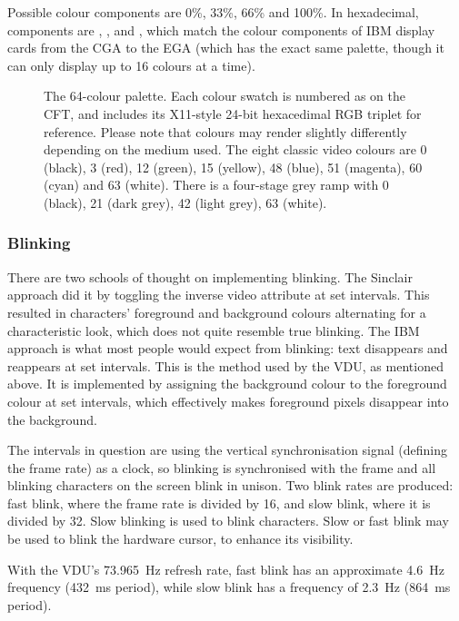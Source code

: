 Possible colour components are 0\%, 33\%, 66\% and 100\%. In hexadecimal,
components are , ,  and , which match the
colour components of IBM display cards from the CGA to the EGA (which has the
exact same palette, though it can only display up to 16 colours at a time).

\begin{figure}
 \centering
 
 \caption[The 64-colour palette]{\label{fig:vdu-colour-palette} The 64-colour
   palette. Each colour swatch is numbered as on the CFT, and includes its
   X11-style 24-bit hexacedimal RGB triplet for reference. Please note that
   colours may render slightly differently depending on the medium used. The
   eight classic video colours are 0 (black), 3 (red), 12 (green), 15 (yellow),
   48 (blue), 51 (magenta), 60 (cyan) and 63 (white). There is a four-stage
   grey ramp with 0 (black), 21 (dark grey), 42 (light grey), 63 (white).}
\end{figure}


\subsubsection{Blinking}

There are two schools of thought on implementing blinking. The Sinclair
approach did it by toggling the inverse video attribute at set intervals. This
resulted in characters' foreground and background colours alternating for a
characteristic look, which does not quite resemble true blinking. The IBM
approach is what most people would expect from blinking: text disappears and
reappears at set intervals. This is the method used by the VDU, as mentioned
above. It is implemented by assigning the background colour to the foreground
colour at set intervals, which effectively makes foreground pixels disappear
into the background.

The intervals in question are using the vertical synchronisation signal
(defining the frame rate) as a clock, so blinking is synchronised with the
frame and all blinking characters on the screen blink in unison. Two blink
rates are produced: fast blink, where the frame rate is divided by 16, and slow
blink, where it is divided by 32. Slow blinking is used to blink
characters. Slow or fast blink may be used to blink the hardware cursor, to
enhance its visibility.

With the VDU's 73.965~Hz refresh rate, fast blink has an approximate 4.6~Hz
frequency (432~ms period), while slow blink has a frequency of 2.3~Hz (864~ms
period).

